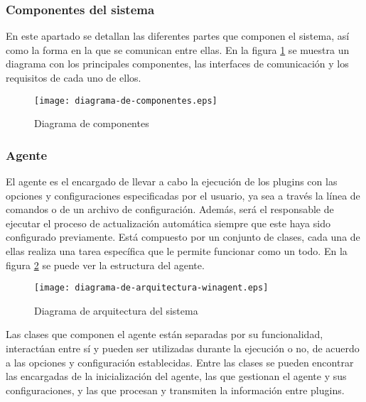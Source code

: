         \subsubsection{Componentes del sistema}
            En este apartado se detallan las diferentes partes que componen el sistema, así como la forma en la que se comunican entre ellas. En la figura \ref{fig:diagrama-de-componentes} se muestra un diagrama con los principales componentes, las interfaces de comunicación y los requisitos de cada uno de ellos.

            \begin{figure}[h!]
            \centering
                \texttt{[image: diagrama-de-componentes.eps]}
                \caption{Diagrama de componentes}
                \label{fig:diagrama-de-componentes}
            \end{figure}

        \subsubsection{Agente}
            El agente es el encargado de llevar a cabo la ejecución de los plugins con las opciones y configuraciones especificadas por el usuario, ya sea a través la línea de comandos o de un archivo de configuración. Además, será el responsable de ejecutar el proceso de actualización automática siempre que este haya sido configurado previamente. Está compuesto por un conjunto de clases, cada una de ellas realiza una tarea específica que le permite funcionar como un todo. En la figura \ref{fig:diagrama-de-arquitectura-winagent} se puede ver la estructura del agente.
            
            \begin{figure}[h!]
            \centering
                \texttt{[image: diagrama-de-arquitectura-winagent.eps]}
                \caption{Diagrama de arquitectura del sistema}
                \label{fig:diagrama-de-arquitectura-winagent}
            \end{figure}

            Las clases que componen el agente están separadas por su funcionalidad, interactúan entre sí y pueden ser utilizadas durante la ejecución o no, de acuerdo a las opciones y configuración establecidas. Entre las clases se pueden encontrar las encargadas de la inicialización del agente, las que gestionan el agente y sus configuraciones, y las que procesan y transmiten la información entre plugins.

